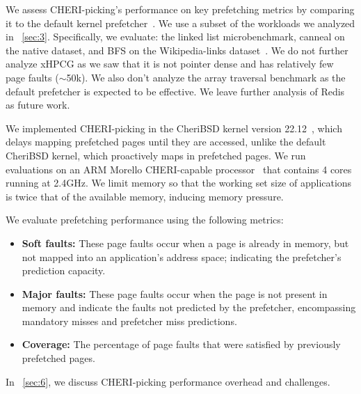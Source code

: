 We assess CHERI-picking's performance on key prefetching metrics by comparing it to the default kernel prefetcher~\cite{vm_fault_readahead}. 
We use a subset of the workloads we analyzed in ~\autoref{sec:3}. Specifically, we evaluate: the linked list microbenchmark, canneal on the native dataset, and BFS on the Wikipedia-links dataset~\cite{wikipedie-dataset}. We do not further analyze xHPCG as we saw that it is not pointer dense and has relatively few page faults ($\sim$50k). We also don't analyze the array traversal benchmark as the default prefetcher is expected to be effective. We leave further analysis of Redis as future work.

We implemented CHERI-picking in the CheriBSD kernel version 22.12~\cite{cheribsd}, which delays mapping prefetched pages until they are accessed, unlike the default CheriBSD kernel, which proactively maps in prefetched pages.
We run evaluations on an ARM Morello CHERI-capable processor~\cite{morelloarm} that contains 4 cores running at 2.4GHz. We limit memory so that the working set size of applications is twice that of the available memory, inducing memory pressure. 


\begin{comment}
CheriBSD    : 22.12 
ARM Version : Armv8-A architecture version Armv8.2-A.
n-cores     : 4
clock rate  : 2.4 GHz (system Main clock)
cache config: (below)
Two dual-core Rainier clusters. Each cluster has:
◦ 64KB private L1 instruction cache for each core
◦ 64KB private L1 data cache for each core
◦ 1MB private L2 unified cache for each core
◦ 1MB shared L3 unified cache in the DynamIQ™ Shared Unit (DSU) Flash Cache Module
(FCM)

\end{comment}






We evaluate prefetching performance using the following metrics:
\begin{itemize}[wide, labelindent=3pt]
    \item \textbf{Soft faults:} These page faults occur when a page is already in memory, but not mapped into an application's address space;
    indicating the prefetcher's prediction capacity. 
    \item \textbf{Major faults:} These page faults occur when the page is not present in memory and indicate the faults not predicted by the prefetcher, encompassing mandatory misses and prefetcher miss predictions. 
    \item \textbf{Coverage:} The percentage of page faults that were satisfied by previously prefetched pages.
\end{itemize}
In ~\autoref{sec:6}, we discuss CHERI-picking performance overhead and challenges.

